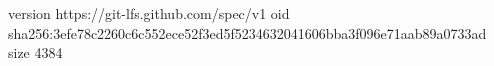version https://git-lfs.github.com/spec/v1
oid sha256:3efe78c2260c6c552ece52f3ed5f5234632041606bba3f096e71aab89a0733ad
size 4384
